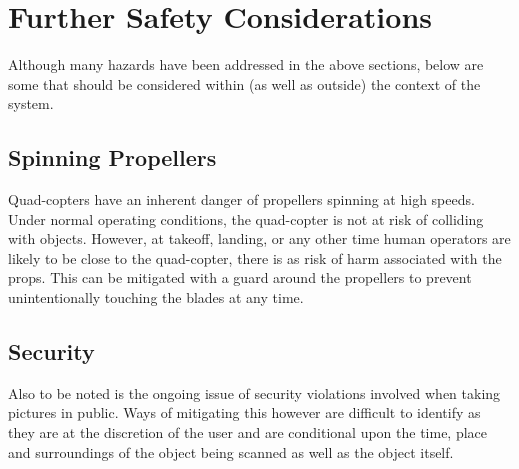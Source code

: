 \documentclass[10pt,letterpaper]{article}
\begin{document}
\newpage


\section{Further Safety Considerations}
Although many hazards have been addressed in the above sections, below are some that should be considered within (as well as outside) the context of the system.

\subsection{Spinning Propellers}
Quad-copters have an inherent danger of propellers spinning at high speeds. Under normal operating conditions, the quad-copter is not at risk of colliding with objects. However, at takeoff, landing, or any other time human operators are likely to be close to the quad-copter, there is as risk of harm associated with the props. This can be mitigated with a guard around the propellers to prevent unintentionally touching the blades at any time.
\subsection{Security}
Also to be noted is the ongoing issue of security violations involved when taking pictures in public. Ways of mitigating this however are difficult to identify as they are at the discretion of the user and are conditional upon the time, place and surroundings of the object being scanned as well as the object itself.
\end{document}
